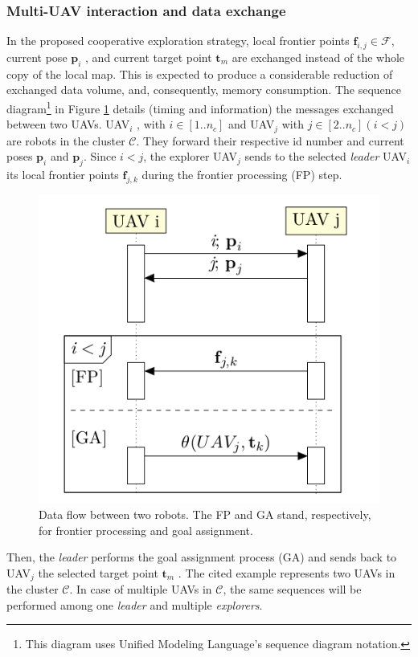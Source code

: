 \documentclass[11pt,openany]{book}
\begin{document}
\subsubsection{Multi-UAV interaction and data exchange}
In the proposed cooperative exploration strategy, local frontier points $\mathbf{f}_{i,j} \in \mathcal{F}$, current pose $\mathbf{p}_i$ , and current target point $\mathbf{t}_m$ are exchanged instead of the whole copy of the local map. This is expected to produce a considerable reduction of exchanged data volume, and, consequently, memory consumption. The sequence diagram\footnote{This diagram uses Unified Modeling Language's sequence diagram notation.} in Figure \ref{fig:4.5} details (timing and information) the messages exchanged between two UAVs. UAV$_i$ , with $i \in [1..n_c]$ and UAV$_j$ with $j \in [2..n_c] (i<j)$ are robots in the cluster $\mathcal{C}$. They forward their respective id number and current poses $\mathbf{p}_i$ and $\mathbf{p}_j$. Since $i < j$, the explorer UAV$_j$ sends to the selected \textit{leader} UAV$_i$ its local frontier points $\mathbf{f}_{j,k}$ during the frontier processing (FP) step.
\begin{figure}[H]
    \centering
    \includegraphics[scale=0.5]{assets/4_5.png}
    \caption{Data ﬂow between two robots. The FP and GA stand, respectively, for frontier processing and goal assignment.}
    \label{fig:4.5}
\end{figure}
Then, the \textit{leader} performs the goal assignment process (GA) and sends back to UAV$_j$ the selected target point $\mathbf{t}_m$ . The cited example represents two UAVs in the cluster $\mathcal{C}$. In case of multiple UAVs in $\mathcal{C}$, the same sequences will be performed among one \textit{leader} and multiple \textit{explorers}.
\end{document}
